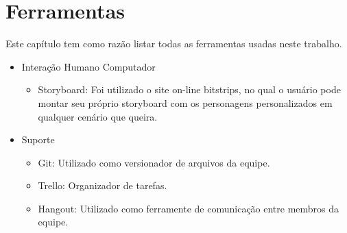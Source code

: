 \chapter[Ferramentas]{Ferramentas}

Este capítulo tem como razão listar todas as ferramentas usadas neste trabalho.

\begin{itemize}
	\item Interação Humano Computador
	\begin {itemize}
		\item Storyboard: Foi utilizado o site on-line bitstrips\nocite{website:bitstrips}, no qual o usuário pode montar seu próprio storyboard com os personagens personalizados em qualquer cenário que queira.
	\end {itemize}
	
	\item Suporte
	\begin {itemize}
		\item Git: Utilizado como versionador de arquivos da equipe.
		\item Trello: Organizador de tarefas.\nocite{website:Trello}
		\item Hangout: Utilizado como ferramente de comunicação entre membros da equipe.
	\end {itemize}
\end{itemize}


